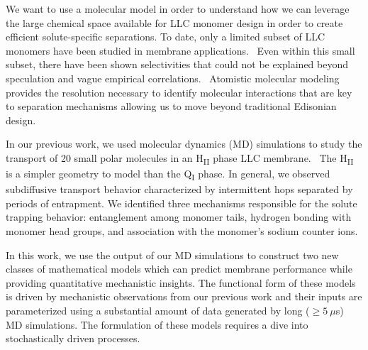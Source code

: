 \documentclass{article}
\begin{document}
  We want to use a molecular model in order to understand how we can leverage the large 
  chemical space available for LLC monomer design in order to create efficient solute-specific
  separations. To date, only a limited subset of LLC monomers have been studied in membrane
  applications.~\cite{carter_glycerol-based_2012,hatakeyama_nanoporous_2010,smith_ordered_1997,zhou_assembly_2003,resel_structural_2000}
  Even within this small subset, there have been shown selectivities that could not be
  explained beyond speculation and vague empirical correlations.~\cite{dischinger_application_2017}
  Atomistic molecular modeling provides the resolution necessary to identify molecular 
  interactions that are key to separation mechanisms allowing us to move beyond 
  traditional Edisonian design.

  In our previous work, we used molecular dynamics (MD) simulations to study the transport
  of 20 small polar molecules in an H\textsubscript{II} phase LLC membrane.~\cite{coscia_chemically_2019}
  The H\textsubscript{II} is a simpler geometry to model than the Q\textsubscript{I} phase.  
  In general, we observed subdiffusive transport behavior characterized by intermittent hops 
  separated by periods of entrapment. We identified three mechanisms responsible for the 
  solute trapping behavior: entanglement among monomer tails, hydrogen bonding with monomer
  head groups, and association with the monomer's sodium counter ions.
  
  In this work, we use the output of our MD simulations to construct two new classes of 
  mathematical models which can predict membrane performance while providing quantitative 
  mechanistic insights. The functional form of these models is driven by mechanistic 
  observations from our previous work and their inputs are parameterized using a 
  substantial amount of data generated by long ($\geq 5~\mu$s) MD simulations. The formulation
  of these models requires a dive into stochastically driven processes.
  
%  
  
\end{document}
